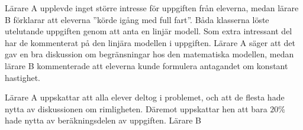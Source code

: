     \textcolor{lila}{Lärare A upplevde inget större intresse för uppgiften från eleverna, medan lärare B förklarar att eleverna ''körde igång med full fart''. Båda klasserna löste utelutande uppgiften genom att anta en linjär modell. Som extra intressant del har de kommenterat på den linjära modellen i uppgiften. Lärare A säger att det gav en bra diskussion om begränsningar hos den matematiska modellen, medan lärare B kommenterade att eleverna kunde formulera antagandet om konstant hastighet.}
    
    \textcolor{lila}{Lärare A uppskattar att alla elever deltog i problemet, och att de flesta hade nytta av diskussionen om rimligheten. Däremot uppskattar hen att bara $20\%$ hade nytta av beräkningsdelen av uppgiften. Lärare B }

    


